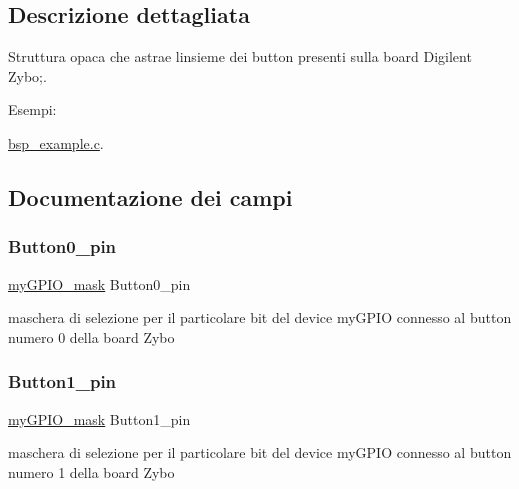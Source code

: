 \subsection{Descrizione dettagliata}
Struttura opaca che astrae l\textquotesingle{}insieme dei button presenti sulla board Digilent Zybo;. \begin{Desc}
\item[Esempi\+: ]\par
\hyperlink{bsp_example_8c-example}{bsp\+\_\+example.\+c}.\end{Desc}


\subsection{Documentazione dei campi}
\mbox{\label{struct_zybo_button__t_af7d7d5a9c9fc174e8f4ee4c762c2abee}} 
\subsubsection{\texorpdfstring{Button0\+\_\+pin}{Button0\_pin}}
{\footnotesize\ttfamily \hyperlink{group__bare-metal_ga402a0d20afc0cb7c25554b8b023f4253}{my\+G\+P\+I\+O\+\_\+mask} Button0\+\_\+pin}

maschera di selezione per il particolare bit del device my\+G\+P\+IO connesso al button numero 0 della board Zybo \mbox{\label{struct_zybo_button__t_a6cb60bb285e32e29c51c15e85206aaeb}} 
\subsubsection{\texorpdfstring{Button1\+\_\+pin}{Button1\_pin}}
{\footnotesize\ttfamily \hyperlink{group__bare-metal_ga402a0d20afc0cb7c25554b8b023f4253}{my\+G\+P\+I\+O\+\_\+mask} Button1\+\_\+pin}

maschera di selezione per il particolare bit del device my\+G\+P\+IO connesso al button numero 1 della board Zybo \mbox{\label{struct_zybo_button__t_a3b4fe634c2d98ce55fdef526c2d230d1}} 
